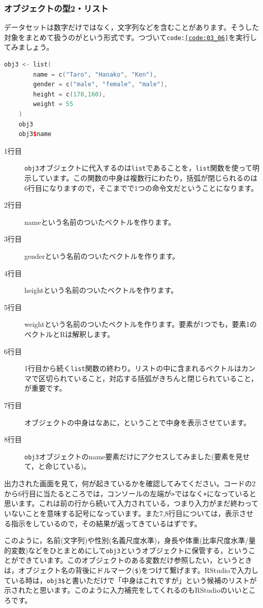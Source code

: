 \documentclass{ltjsbook}
\begin{document}
\subsubsection{オブジェクトの型2・リスト}
データセットは数字だけではなく，文字列などを含むことがあります。そうした対象をまとめて扱うのがという形式です。つづいて\texttt{code:\ref{code:03_06}}を実行してみましょう。
\begin{lstlisting}[language=c++,label={code:03_06},caption={リスト型}]
	obj3 <- list(
		name = c("Taro", "Hanako", "Ken"),
		gender = c("male", "female", "male"),
		height = c(170,160),
		weight = 55
	)
	obj3
	obj3$name
\end{lstlisting}
\begin{description}
	\item[1行目] \texttt{obj3}オブジェクトに代入するのは\texttt{list}であることを，\texttt{list}関数を使って明示しています。この関数の中身は複数行にわたり，括弧が閉じられるのは6行目になりますので，そこまでで1つの命令文だということになります。
	\item[2行目] nameという名前のついたベクトルを作ります。
	\item[3行目] genderという名前のついたベクトルを作ります。
	\item[4行目] heightという名前のついたベクトルを作ります。
	\item[5行目] weightという名前のついたベクトルを作ります。要素が1つでも，要素1のベクトルとRは解釈します。
	\item[6行目] 1行目から続く\texttt{list}関数の終わり。リストの中に含まれるベクトルはカンマで区切られていること，対応する括弧がきちんと閉じられていること，が重要です。
	\item[7行目] オブジェクトの中身はなあに，ということで中身を表示させています。
	\item[8行目] \texttt{obj3}オブジェクトのname要素だけにアクセスしてみました(要素を見せて，と命じている)。
\end{description}

出力された画面を見て，何が起きているかを確認してみてください。コードの2から6行目に当たるところでは，コンソールの左端が\verb|>|ではなく\verb|+|になっていると思います。これは前の行から続いて入力されている，つまり入力がまだ終わっていないことを意味する記号になっています。また7,8行目については，表示させる指示をしているので，その結果が返ってきているはずです。

このように，名前(文字列)や性別(名義尺度水準)，身長や体重(比率尺度水準/量的変数)などをひとまとめにして\texttt{obj3}というオブジェクトに保管する，ということができています。このオブジェクトのある変数だけ参照したい，というときは，オブジェクト名の背後にドルマーク(\verb|$|)をつけて繋げます。RStudioで入力している時は，\verb|obj3$|と書いただけで「中身はこれですが」という候補のリストが示されたと思います。このように入力補完をしてくれるのもRStudioのいいところです。
\end{document}
